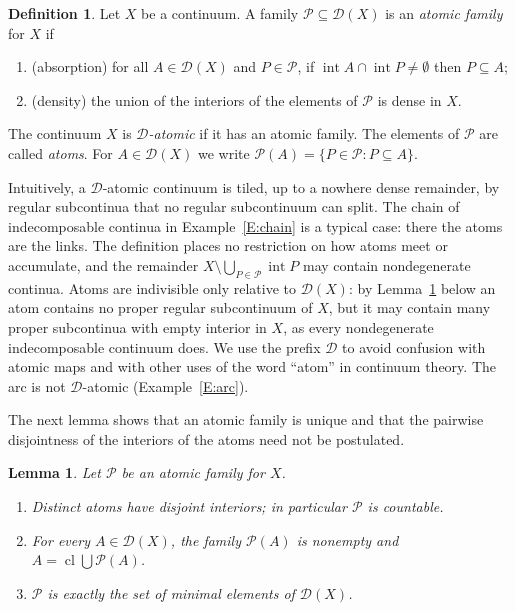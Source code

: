 \documentclass[11pt,reqno]{amsart}
\theoremstyle{plain}
\newtheorem{lemma}[theorem]{Lemma}
\theoremstyle{definition}
\newtheorem{definition}[theorem]{Definition}
\theoremstyle{remark}
\newcommand{\D}{\mathcal{D}}
\newcommand{\PP}{\mathcal{P}}
\newcommand{\cl}{\operatorname{cl}}
\newcommand{\intr}{\operatorname{int}}
\begin{document}
\begin{definition}\label{D:atomic}
Let $X$ be a continuum. A family $\PP\subseteq\D(X)$ is an \emph{atomic family} for $X$ if
\begin{enumerate}[label=\textup{(A\arabic*)}]
\item\label{A1} \textup{(absorption)} for all $A\in\D(X)$ and $P\in\PP$, if $\intr A\cap\intr P\neq\emptyset$ then $P\subseteq A$;
\item\label{A2} \textup{(density)} the union of the interiors of the elements of $\PP$ is dense in $X$.
\end{enumerate}
The continuum $X$ is \emph{$\D$-atomic} if it has an atomic family. The elements of $\PP$ are called \emph{atoms}. For $A\in\D(X)$ we write $\PP(A)=\{P\in\PP:P\subseteq A\}$.
\end{definition}

Intuitively, a $\D$-atomic continuum is tiled, up to a nowhere dense remainder, by regular subcontinua that no regular subcontinuum can split. The chain of indecomposable continua in Example~\ref{E:chain} is a typical case: there the atoms are the links. The definition places no restriction on how atoms meet or accumulate, and the remainder $X\setminus\bigcup_{P\in\PP}\intr P$ may contain nondegenerate continua. Atoms are indivisible only relative to $\D(X)$: by Lemma~\ref{L:atomic} below an atom contains no proper regular subcontinuum of $X$, but it may contain many proper subcontinua with empty interior in $X$, as every nondegenerate indecomposable continuum does. We use the prefix $\D$ to avoid confusion with atomic maps and with other uses of the word ``atom'' in continuum theory. The arc is not $\D$-atomic (Example~\ref{E:arc}).

The next lemma shows that an atomic family is unique and that the pairwise disjointness of the interiors of the atoms need not be postulated.

\begin{lemma}\label{L:atomic}
Let $\PP$ be an atomic family for $X$.
\begin{enumerate}[label=\textup{(\alph*)}]
\item\label{at:disj} Distinct atoms have disjoint interiors; in particular $\PP$ is countable.
\item\label{at:rec} For every $A\in\D(X)$, the family $\PP(A)$ is nonempty and $A=\cl\bigcup\PP(A)$.
\item\label{at:min} $\PP$ is exactly the set of minimal elements of $\D(X)$.
\end{enumerate}
\end{lemma}
\end{document}
